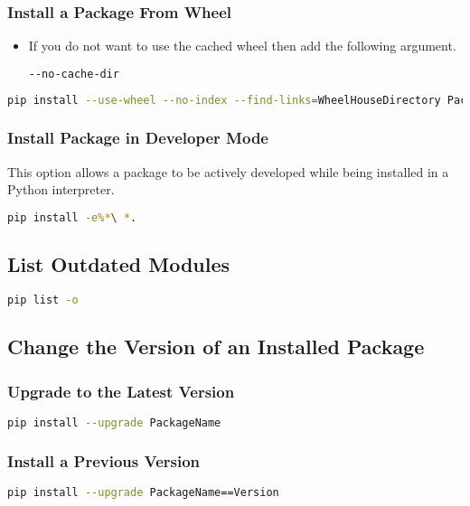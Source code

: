 \subsubsection{Install a Package From Wheel}
\begin{itemize}
  \item If you do not want to use the cached wheel then add the following argument.
\begin{lstlisting}[language=bash, numbers=none]
--no-cache-dir
\end{lstlisting}
\end{itemize}
\begin{lstlisting}[basicstyle=\bfseries\footnotesize, language=bash, numbers=none]
pip install --use-wheel --no-index --find-links=WheelHouseDirectory PackageName
\end{lstlisting}
%
\subsubsection{Install Package in Developer Mode}
This option allows a package to be actively developed while being installed in
a Python interpreter.
\begin{lstlisting}[language=bash, numbers=none]
pip install -e%*\ *.
\end{lstlisting}

\subsection{List Outdated Modules}
\begin{lstlisting}[language=bash, numbers=none]
pip list -o
\end{lstlisting}

\subsection{Change the Version of an Installed Package}
%
\subsubsection{Upgrade to the Latest Version}
\begin{lstlisting}[language=bash, numbers=none]
pip install --upgrade PackageName
\end{lstlisting}

\subsubsection{Install a Previous Version}
\begin{lstlisting}[language=bash, numbers=none]
pip install --upgrade PackageName==Version
\end{lstlisting}

